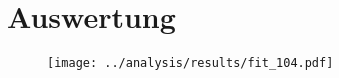 \section{Auswertung}

\begin{figure}
  \centering
  \texttt{[image: ../analysis/results/fit\_104.pdf]}
  \caption{}
  \label{}
\end{figure}
